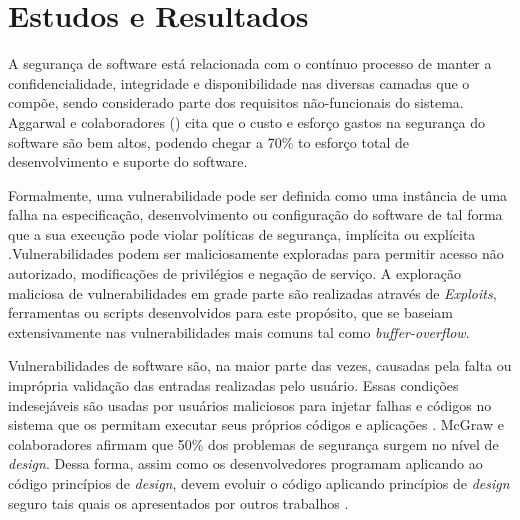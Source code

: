 \section{Estudos e Resultados}
\label{sec:studies}






A segurança de software está relacionada com o contínuo processo de manter a confidencialidade, integridade e disponibilidade nas diversas camadas que o compõe, sendo considerado parte dos requisitos não-funcionais do sistema. Aggarwal e colaboradores (\cite{aggarwal2002}) cita que o custo e esforço gastos na segurança do software são bem altos, podendo chegar a 70\% to esforço total de desenvolvimento e suporte do software.

Formalmente, uma vulnerabilidade pode ser definida como uma instância de uma falha na especificação, desenvolvimento ou configuração do software de tal forma que a sua execução pode violar políticas de segurança, implícita ou explícita \cite{krsul1998}.Vulnerabilidades podem ser maliciosamente exploradas para permitir acesso não autorizado, modificações de privilégios e negação de serviço. A exploração maliciosa de vulnerabilidades em grade parte são realizadas através de \emph{Exploits}, ferramentas ou scripts desenvolvidos para este propósito, que se baseiam extensivamente nas vulnerabilidades mais comuns tal como \emph{buffer-overflow}. 

Vulnerabilidades de software são, na maior parte das vezes, causadas pela falta ou imprópria validação das entradas realizadas pelo usuário. Essas condições indesejáveis são usadas por usuários maliciosos para injetar falhas e códigos no sistema que os permitam executar seus próprios códigos e aplicações  \cite{jimenez2009}. McGraw e colaboradores \cite{mcgraw2004} afirmam que 50\% dos problemas de segurança surgem no nível de \emph{design}. Dessa forma, assim como os desenvolvedores programam aplicando ao código princípios de \emph{design}, devem evoluir o código aplicando princípios de \emph{design} seguro tais quais os apresentados por outros trabalhos \cite{saltzer1975} \cite{bishop2003} \cite{mcgraw2002} \cite{a1lshammari2009}.

